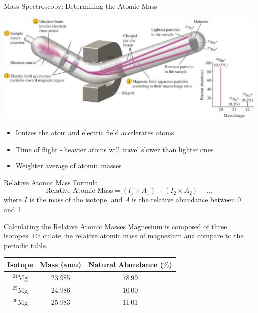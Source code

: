 \documentclass[11pt]{beamer}
\begin{document}
\begin{frame}{Mass Spectroscopy: Determining the Atomic Mass}
  \begin{center}
    \includegraphics[width=\linewidth]{mass_spect}
  \end{center}

  \begin{itemize}
  \item Ionizes the atom and electric field accelerates atoms
  \item Time of flight - heavier atoms will travel slower
    than lighter ones
  \item Weighter average of atomic masses
  \end{itemize}
\end{frame}

\begin{frame}{Relative Atomic Mass Formula}
  \begin{equation}
    \text{Relative Atomic Mass} = (I_1\times A_1) + (I_2\times A_2) + \dots
  \end{equation}
  where $I$ is the mass of the isotope, and $A$ is the
  relative abundance between 0 and 1
\end{frame}

\begin{frame}{Calculating the Relative Atomic Masses}
  Magnesium is composed of three isotopes. Calculate the
  relative atomic mass of magnesium and compare to the periodic
  table.
  \begin{center}
  \begin{tabular}{ccc}
    Isotope & Mass (amu) & Natural Abundance ($\%$) \\
    \hline
    $^{24}$Mg & 23.985 & 78.99 \\
    $^{25}$Mg & 24.986 & 10.00 \\
    $^{26}$Mg & 25.983 & 11.01
  \end{tabular}
  \end{center}
\end{frame}
\end{document}
